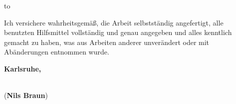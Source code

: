 \vspace*{32\baselineskip}
\hbox to \textwidth{\hrulefill}
\par
Ich versichere wahrheitsgemäß, die Arbeit selbstständig angefertigt, alle benutzten Hilfsmittel vollständig und genau angegeben und alles kenntlich gemacht zu haben, was aus Arbeiten anderer unverändert oder mit Abänderungen entnommen wurde.

\textbf{Karlsruhe, \submissiontime}
\vspace{1.5cm}

\dotfill\hspace*{8.0cm}\\
\hspace*{2cm}(\textbf{Nils Braun}) %


\thispagestyle{empty}

\cleardoublepage

% 
% 
